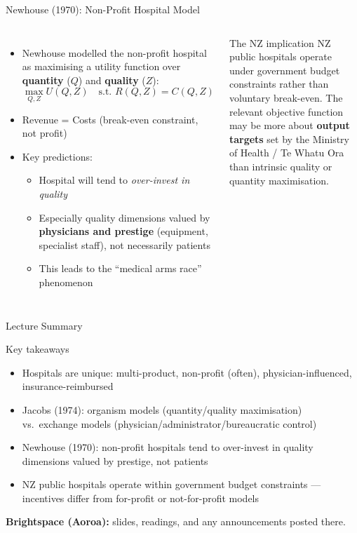 \documentclass[aspectratio=169, 12pt]{beamer}
\newcommand{\summaryside}[1]{%
  \begin{frame}{Lecture Summary}
    \begin{exampleblock}{Key takeaways}
      \begin{itemize}#1\end{itemize}
    \end{exampleblock}
    \vspace{0.5em}
    {\footnotesize\textcolor{OtagoGold}{\textbf{Brightspace (Aoroa):}} slides, readings, and any announcements posted there.}
  \end{frame}}
\begin{document}
\begin{frame}{Newhouse (1970): Non-Profit Hospital Model}
  \begin{columns}
      \begin{itemize}
        \item Newhouse modelled the non-profit hospital as maximising a utility function
              over \textbf{quantity} ($Q$) and \textbf{quality} ($Z$):
              $$\max_{Q,Z} U(Q, Z) \quad \text{s.t.\ } R(Q,Z) = C(Q,Z)$$
        \item Revenue = Costs (break-even constraint, not profit)
        \item Key predictions:
        \begin{itemize}
          \item Hospital will tend to \emph{over-invest in quality}
          \item Especially quality dimensions valued by \textbf{physicians and prestige}
                (equipment, specialist staff), not necessarily patients
          \item This leads to the ``medical arms race'' phenomenon
        \end{itemize}
      \end{itemize}
      \begin{alertblock}{The NZ implication}
        NZ public hospitals operate under government budget constraints rather than voluntary
        break-even. The relevant objective function may be more about \textbf{output targets}
        set by the Ministry of Health / Te Whatu Ora than intrinsic quality or quantity
        maximisation.
      \end{alertblock}
  \end{columns}
\end{frame}

\summaryside{
  \item Hospitals are unique: multi-product, non-profit (often), physician-influenced, insurance-reimbursed
  \item Jacobs (1974): organism models (quantity/quality maximisation) vs.\ exchange models (physician/administrator/bureaucratic control)
  \item Newhouse (1970): non-profit hospitals tend to over-invest in quality dimensions valued by prestige, not patients
  \item NZ public hospitals operate within government budget constraints --- incentives differ from for-profit or not-for-profit models
}
\end{document}
